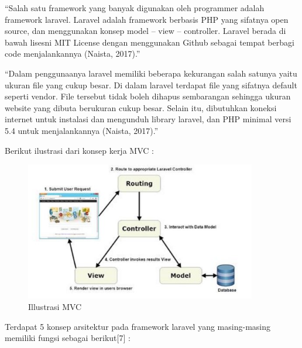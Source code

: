 “Salah satu framework yang banyak digunakan oleh programmer adalah framework laravel. Laravel adalah framework berbasis PHP yang sifatnya open source, dan menggunakan konsep model – view – controller. Laravel berada di bawah lisesni MIT License dengan menggunakan Github sebagai tempat berbagi code menjalankannya (Naista, 2017).”

“Dalam penggunaanya laravel memiliki beberapa kekurangan salah satunya yaitu ukuran file yang cukup besar. Di dalam laravel terdapat file yang sifatnya default seperti vendor. File tersebut tidak boleh dihapus sembarangan sehingga ukuran website yang dibuta berukuran cukup besar. Selain itu, dibutuhkan koneksi internet untuk instalasi dan mengunduh library laravel, dan PHP minimal versi 5.4 untuk menjalankannya (Naista, 2017).” 

Berikut ilustrasi dari konsep kerja MVC : \\

\begin{figure}
	\centering
	\includegraphics[width=0.9\textwidth]
	{pics/ilustrasimvc.jpg}
	\caption{Illustrasi MVC}
	\label{fig:31}
\end{figure}

Terdapat 5 konsep arsitektur pada framework laravel yang masing-masing memiliki fungsi sebagai berikut[7] :

